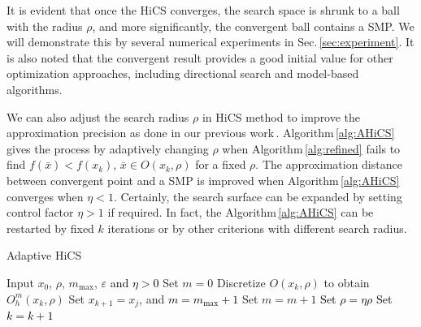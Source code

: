 \documentclass[final,1p,times]{elsarticle}
\begin{document}
It is evident that once the HiCS converges,
the search space is shrunk to a ball with the radius $\rho$, and
more significantly, the convergent ball contains a SMP.
We will demonstrate this by several numerical experiments in
Sec.\,\ref{sec:experiment}.
It is also noted that the convergent result provides a
good initial value for other optimization approaches, including 
directional search and model-based algorithms.

We can also adjust the search radius $\rho$ in HiCS method 
to improve the approximation precision as done in our previous
work\,\cite{huang2017hill}. Algorithm\,\ref{alg:AHiCS} gives the
process by adaptively changing $\rho$ when Algorithm\,\ref{alg:refined} fails
to find $f(\bar{x})<f(x_k)$, $\bar{x}\in O(x_k, \rho)$ for a fixed $\rho$.
The approximation distance between convergent point and a SMP is
improved when Algorithm\,\ref{alg:AHiCS} converges when $\eta <1$.
Certainly, the search surface can be expanded by setting
control factor $\eta>1$ if required. 
In fact, the Algorithm\,\ref{alg:AHiCS} can be restarted by
fixed $k$ iterations or by other criterions
with different search radius.

%
%
\begin{algorithm}[H]
	\caption{Adaptive HiCS}
	\label{alg:AHiCS}
\begin{algorithmic}[1]
	\STATE Input $x_0$, $\rho$, $m_{\max}$,
	\textcolor{black}{$\varepsilon$ and $\eta>0$}
	\IF { \textcolor{black}{ $\rho>\varepsilon$}}
		\STATE Set $m=0$
			\STATE Discretize $O(x_k,\rho)$ to obtain $O^m_h(x_k,\rho)$
			\STATE Set $x_{k+1}=x_j$, 
				and \textcolor{black}{$m=m_{\max}+1$} 
			\ELSE
				\STATE Set $m = m+1$
			\ENDIF
		\ELSE
			\STATE \textcolor{black}{ Set $\rho=\eta\rho$}
		\ENDIF
		\STATE \textcolor{black}{Set $k=k+1$}
	\ENDFOR
\ENDIF
\end{algorithmic}
\end{algorithm}
\end{document}
